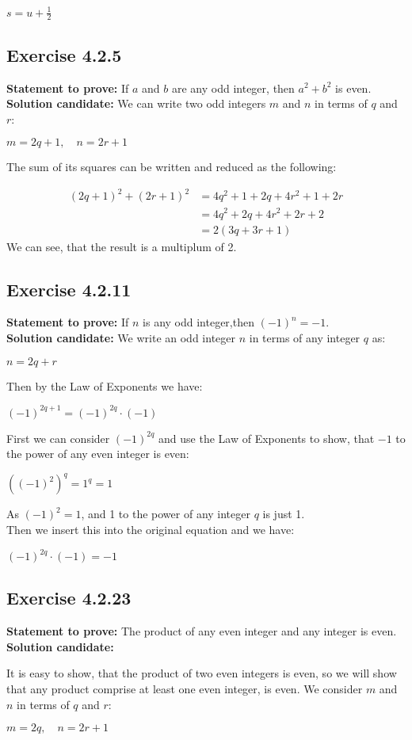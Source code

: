 \documentclass{report}
\newcommand{\cent}[1]{\begin{center}#1\end{center}}
\newcommand{\mAlign}[1]{\begin{align*}#1\end{align*}}
\newcommand{\Prove}{\textbf{Statement to prove: }}
\newcommand{\Solution}{\textbf{Solution candidate: }}
\newcommand{\QED}{\boxed{}}
\newcommand{\Exercise}[1]{\subsection{Exercise #1}}
\begin{document}
	\cent{$s=u+\frac{1}{2}$}
	
	\QED
	
	\Exercise{4.2.5}
	\Prove
	If $a$ and $b$ are any odd integer, then $a^2 + b^2$ is even.\\
	
	\Solution
	We can write two odd integers $m$ and $n$ in terms of $q$ and $r$:
	\cent{$m = 2q+1, \quad n = 2r+1$}
	
	The sum of its squares can be written and reduced as the following:
	
	\mAlign{(2q+1)^2 + (2r+1)^2 &= 4q^2 + 1 + 2q + 4r^2 + 1 +2r \\
					&= 4q^2+2q + 4r^2 + 2r +2 \\
					&= 2(3q +3r +1)}
	We can see, that the result is a multiplum of 2.\\
	\QED
	
	\Exercise{4.2.11}
	
	\Prove
	If $n$ is any odd integer,then $(-1)^n = -1$.\\
	
	\Solution
	We write an odd integer $n$ in terms of any integer $q$ as:
	
	\cent{$n = 2q+r$}
	
	Then by the Law of Exponents we have:
	
	\cent{$(-1)^{2q + 1} = (-1)^{2q} \cdot (-1)$}
	
	First we can consider $(-1)^{2q}$ and use the Law of Exponents to show, that $-1$ to the power of any even integer is even:
	
	\cent{$((-1)^2)^q = 1^q = 1$}
	
	As $(-1)^2 = 1$, and 1 to the power of any integer $q$ is just 1.\\
	
	Then we insert this into the original equation and we have:
	
	\cent{$(-1)^{2q} \cdot (-1) = -1$}
	
	\QED
	
	\Exercise{4.2.23}
	
	\Prove
	The product of any even integer and any integer is even.\\
	
	\Solution
	
	It is easy to show, that the product of two even integers is even, so we will show that any product comprise at least one even integer, is even. We consider $m$ and $n$ in terms of $q$ and $r$:
	
	\cent{$m = 2q, \quad n = 2r+1$}
	
\end{document}
